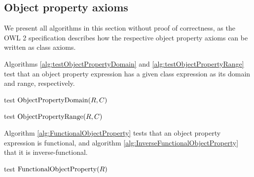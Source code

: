 \documentclass[paper.tex]{subfiles}
\begin{document}
\subsection{Object property axioms}
\label{sec:algorithms:objprop}

We present all algorithms in this section without proof of correctness, as the OWL 2 specification \cite{W3C:OWL2Syntax} describes how the respective object property axioms can be written as class axioms.

Algorithms \ref{alg:testObjectPropertyDomain} and \ref{alg:testObjectPropertyRange} test that an object property expression has a given class expression as its domain and range, respectively.

\begin{algorithm}[H]
  \caption{test $\mathrm{ObjectPropertyDomain}(R, C)$}
  \label{alg:testObjectPropertyDomain}
  \begin{algorithmic}[1]
    \raggedright
      \State \Return {}
    \EndFunction
  \end{algorithmic}
\end{algorithm}

\begin{algorithm}[H]
  \caption{test $\mathrm{ObjectPropertyRange}(R, C)$}
  \label{alg:testObjectPropertyRange}
  \begin{algorithmic}[1]
    \raggedright
      \State \Return {}
    \EndFunction
  \end{algorithmic}
\end{algorithm}

Algorithm \ref{alg:FunctionalObjectProperty} tests that an object property expression is functional, and algorithm \ref{alg:InverseFunctionalObjectProperty} that it is inverse-functional.

\begin{algorithm}[H]
  \caption{test $\mathrm{FunctionalObjectProperty}(R)$}
  \label{alg:FunctionalObjectProperty}
  \begin{algorithmic}[1]
    \raggedright
      \State \Return {}
    \EndFunction
  \end{algorithmic}
\end{algorithm}
\end{document}
